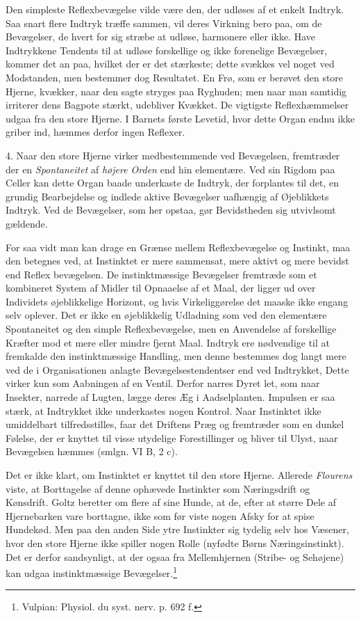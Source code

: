 \documentclass[12pt,a4paper,openany]{book}
\newcommand{\opage}[1]{\marginnote{\footnotesize\textit{[#1]}}}
\begin{document}
Den simpleste Reflexbevægelse vilde være den, der udløses af et enkelt
Indtryk. Saa snart flere Indtryk træffe sammen, vil deres Virkning bero
paa, om de Bevægelser, de hvert for sig stræbe at udløse, harmonere
eller ikke. Have Indtrykkene Tendents til at udløse forskellige og ikke
forenelige Bevægelser, kommer det an paa, hvilket der er det stærkeste;
dette svækkes vel noget ved Modstanden, men bestemmer dog Resultatet. En
Frø, som er berøvet den store Hjerne, kvækker, naar den sagte stryges
paa Ryghuden; men naar man samtidig irriterer dens Bagpote stærkt,
udebliver Kvækket. De vigtigste Reflexhæmmelser udgaa fra den store
Hjerne. I Barnets første Levetid, hvor dette Organ endnu ikke griber
ind, hæmmes derfor ingen Reflexer.

4. Naar den store Hjerne virker medbestemmende ved Bevægelsen,
fremtræder der en \emph{Spontaneitet} af \emph{højere Orden} end hin
elementære. Ved sin Rigdom paa Celler kan dette Organ baade underkaste
de Indtryk, der forplantes til det, en grundig Bearbejdelse og indlede
aktive Bevægelser uafhængig af Øjeblikkets Indtryk. Ved de Bevægelser,
som her opstaa, gør Bevidstheden sig utvivlsomt gældende.

For saa vidt man kan drage en Grænse mellem Reflexbevægelse og Instinkt,
maa den betegnes ved, at Instinktet er mere sammensat, mere aktivt og
mere bevidst end Reflex%
\opage{370}bevægelsen. De instinktmæssige Bevægelser fremtræde som et
kombineret System af Midler til Opnaaelse af et Maal, der ligger ud over
Individets øjeblikkelige Horizont, og hvis Virkeliggørelse det maaske
ikke engang selv oplever. Det er ikke en øjeblikkelig Udladning som ved
den elementære Spontaneitet og den simple Reflexbevægelse, men en
Anvendelse af forskellige Kræfter mod et mere eller mindre fjernt Maal.
Indtryk ere nødvendige til at fremkalde den instinktmæssige Handling,
men denne bestemmes dog langt mere ved de i Organisationen anlagte
Bevægelsestendentser end ved Indtrykket, Dette virker kun som Aabningen
af en Ventil. Derfor narres Dyret let, som naar Insekter, narrede af
Lugten, lægge deres Æg i Aadselplanten. Impulsen er saa stærk, at
Indtrykket ikke underkastes nogen Kontrol. Naar Instinktet ikke
umiddelbart tilfredsstilles, faar det Driftens Præg og fremtræder som en
dunkel Følelse, der er knyttet til visse utydelige Forestillinger og
bliver til Ulyst, naar Bevægelsen hæmmes (smlgn. VI B, 2 c).

Det er ikke klart, om Instinktet er knyttet til den store Hjerne.
Allerede \emph{Flourens} viste, at Borttagelse af denne ophævede
Instinkter som Næringsdrift og Kønsdrift. Goltz beretter om flere af
sine Hunde, at de, efter at større Dele af Hjernebarken vare borttagne,
ikke som før viste nogen Afsky for at spise Hundekød. Men paa den anden
Side ytre Instinkter sig tydelig selv hos Væsener, hvor den store Hjerne
ikke spiller nogen Rolle (nyfødte Børns Næringsinstinkt). Det er derfor
sandsynligt, at der ogsaa fra Mellemhjernen (Stribe- og Sehøjene) kan
udgaa instinktmæssige Bevægelser.\footnote[1]{Vulpian: Physiol. du syst.
nerv. p. 692 f.}
\end{document}

